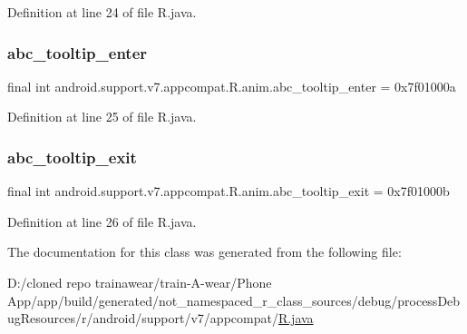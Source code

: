 Definition at line 24 of file R.\+java.

\mbox{\label{classandroid_1_1support_1_1v7_1_1appcompat_1_1_r_1_1anim_a48bf3ae33d447cbde3d73a282b5c81ef}} 
\subsubsection{\texorpdfstring{abc\_tooltip\_enter}{abc\_tooltip\_enter}}
{\footnotesize\ttfamily final int android.\+support.\+v7.\+appcompat.\+R.\+anim.\+abc\+\_\+tooltip\+\_\+enter = 0x7f01000a\hspace{0.3cm}{\ttfamily [static]}}



Definition at line 25 of file R.\+java.

\mbox{\label{classandroid_1_1support_1_1v7_1_1appcompat_1_1_r_1_1anim_a497b957ed79509d03b990691d9bd02a3}} 
\subsubsection{\texorpdfstring{abc\_tooltip\_exit}{abc\_tooltip\_exit}}
{\footnotesize\ttfamily final int android.\+support.\+v7.\+appcompat.\+R.\+anim.\+abc\+\_\+tooltip\+\_\+exit = 0x7f01000b\hspace{0.3cm}{\ttfamily [static]}}



Definition at line 26 of file R.\+java.



The documentation for this class was generated from the following file\+:\begin{DoxyCompactItemize}
\item 
D\+:/cloned repo trainawear/train-\/\+A-\/wear/\+Phone App/app/build/generated/not\+\_\+namespaced\+\_\+r\+\_\+class\+\_\+sources/debug/process\+Debug\+Resources/r/android/support/v7/appcompat/\mbox{\hyperlink{process_debug_resources_2r_2android_2support_2v7_2appcompat_2_r_8java}{R.\+java}}\end{DoxyCompactItemize}
